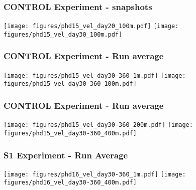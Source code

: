 \documentclass{beamer}
\begin{document}
\frame
{
  \frametitle{CONTROL Experiment - snapshots}
\begin{center}
\texttt{[image: figures/phd15\_vel\_day20\_100m.pdf]}
\texttt{[image: figures/phd15\_vel\_day30\_100m.pdf]}
\end{center}
}



\frame
{
  \frametitle{CONTROL Experiment - Run average}
\begin{center}
\texttt{[image: figures/phd15\_vel\_day30-360\_1m.pdf]}
\texttt{[image: figures/phd15\_vel\_day30-360\_100m.pdf]}
\end{center}
}

\frame
{
  \frametitle{CONTROL Experiment - Run average}
\begin{center}
\texttt{[image: figures/phd15\_vel\_day30-360\_200m.pdf]}
\texttt{[image: figures/phd15\_vel\_day30-360\_400m.pdf]}
\end{center}
}

\frame
{
  \frametitle{S1 Experiment - Run Average}
\begin{center}
\texttt{[image: figures/phd16\_vel\_day30-360\_1m.pdf]}
\texttt{[image: figures/phd16\_vel\_day30-360\_400m.pdf]}
\end{center}
}
\end{document}
